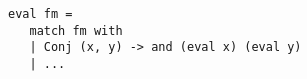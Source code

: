 

\begin{figure}[!t]
  \centering
  \begin{minipage}{0.75\textwidth}
    \begin{lstlisting}[frame=tb]
 eval fm =
   match fm with
   | Conj (x, y) -> and (eval x) (eval y)
   | ...
    \end{lstlisting}
  \end{minipage}
\end{figure}
